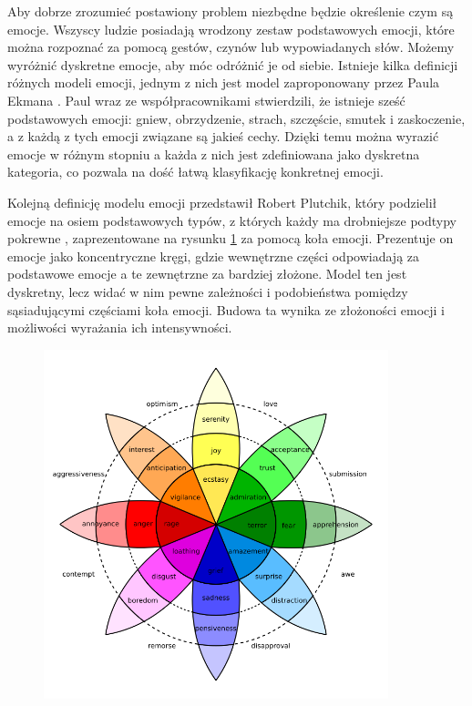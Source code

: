 Aby dobrze zrozumieć postawiony problem niezbędne będzie określenie czym są emocje. Wszyscy ludzie posiadają wrodzony zestaw podstawowych emocji, które można rozpoznać za pomocą gestów, czynów lub wypowiadanych słów. Możemy wyróżnić dyskretne emocje, aby móc odróżnić je od siebie. Istnieje kilka definicji różnych modeli emocji, jednym z nich jest model zaproponowany przez Paula Ekmana \cite{ekman1993facial}. Paul wraz ze współpracownikami stwierdzili, że istnieje sześć podstawowych emocji: gniew, obrzydzenie, strach, szczęście, smutek i zaskoczenie, a z każdą z tych emocji związane są jakieś cechy. Dzięki temu można wyrazić emocje w różnym stopniu a każda z nich jest zdefiniowana jako dyskretna kategoria, co pozwala na dość łatwą klasyfikację konkretnej emocji.

Kolejną definicję modelu emocji przedstawił Robert Plutchik, który podzielił emocje na osiem podstawowych typów, z których każdy ma drobniejsze podtypy pokrewne \cite{plutchik1982psychoevolutionary}, zaprezentowane na rysunku \ref{rys:plutchik_wheel} za pomocą koła emocji. Prezentuje on emocje jako koncentryczne kręgi, gdzie wewnętrzne części odpowiadają za podstawowe emocje a te zewnętrzne za bardziej złożone. Model ten jest dyskretny, lecz widać w nim pewne zależności i podobieństwa pomiędzy sąsiadującymi częściami koła emocji. Budowa ta wynika ze złożoności emocji i możliwości wyrażania ich intensywności.

\begin{figure}[t]
\centering\includegraphics[width=10cm]{figures/plutchik-wheel.png}
\label{rys:plutchik_wheel}
\end{figure}

